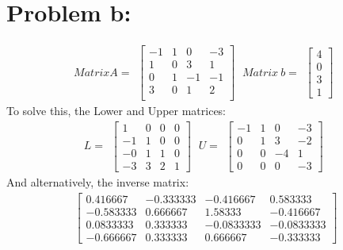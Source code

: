 \documentclass[a4paper, 10pt]{article}
\begin{document}
\section{Problem b:}
\begin{equation*}
Matrix A =
\begin{matrix}
	\begin{bmatrix}
	-1 & 1 & 0 & -3\\ 1 & 0 & 3 & 1 \\ 0 & 1 & -1 & -1 \\ 3 & 0 & 1 & 2\\ 
	\end{bmatrix}
\end{matrix}
\ Matrix \ b =
\begin{matrix}
	\begin{bmatrix}
	4 \\ 0 \\ 3 \\ 1
	\end{bmatrix}
\end{matrix}
\end{equation*}
To solve this, the Lower and Upper matrices:
\begin{equation*}
L =
\begin{matrix}
	\begin{bmatrix}
	1 &	0 &	0 &	0\\	-1 &	1 &	0 &	0\\	-0 &	1 &	1 &	0\\ -3 & 3 &	2 &	1
	\end{bmatrix}
\end{matrix}
\ U =
\begin{matrix}
	\begin{bmatrix}
	-1 & 1 & 0 & -3\\	
	 0 & 1 & 3 & -2\\
	 0 & 0 & -4 & 1\\
	 0 & 0 & 0 & -3
	\end{bmatrix}
\end{matrix}
\end{equation*}
And alternatively, the inverse matrix:
\begin{equation*}
\begin{matrix}
	\begin{bmatrix}
0.416667 &	-0.333333 &	-0.416667 &	0.583333\\	
-0.583333 &	0.666667 &	1.58333 &	-0.416667\\
0.0833333 &	0.333333 &	-0.0833333 & -0.0833333\\	
-0.666667 &	0.333333 &	0.666667 &	-0.333333	
	\end{bmatrix}
\end{matrix}
\end{equation*}
\end{document}
